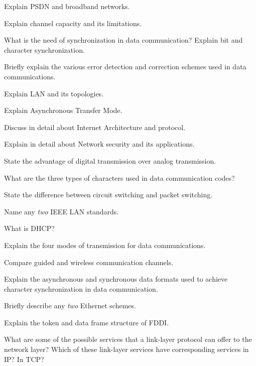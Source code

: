 \newpage \again

\item \iitem Explain PSDN and broadband networks.
\item Explain channel capacity and its limitations.
\ene
\ene

\item \iitem What is the need of synchronization in data communication? Explain
  bit and character synchronization.
\Or
\item Briefly explain the various error detection and correction schemes used in
  data communications.
\ene

\item \iitem Explain LAN and its topologies.
\Or
\item Explain Asynchronous Transfer Mode.
\ene

\item \iitem Discuss in detail about Internet Architecture and protocol.
\Or
\item Explain in detail about Network security and its applications.
\ene

\markC
\ene

\newpage

\sub{\subj}
\maxtime

\partA

\iitem State the advantage of digital transmission over analog transmission.
\item What are the three types of characters used in data communication codes?
\item State the difference between circuit switching and packet switching.
\item Name any \emph{two} IEEE LAN standards.
\item What is DHCP?

\markA
\partB

\item Explain the four modes of transmission for data communications.
\item Compare guided and wireless communication channels.
\item Explain the asynchronous and synchronous data formats used to achieve
  character synchronization in data communication.
\item Briefly describe any \emph{two} Ethernet schemes.
\item Explain the token and data frame structure of FDDI.
\item What are some of the possible services that a link-layer protocol can offer
  to the network layer? Which of these link-layer services have corresponding
  services in IP? In TCP?

